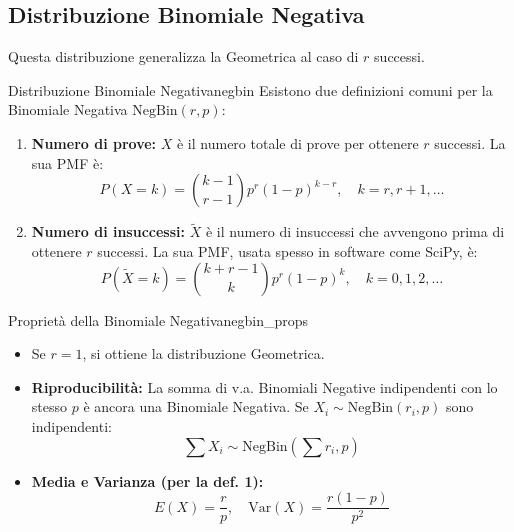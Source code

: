 \subsection{Distribuzione Binomiale Negativa}
Questa distribuzione generalizza la Geometrica al caso di \(r\) successi.

\begin{definizione}{Distribuzione Binomiale Negativa}{negbin}
Esistono due definizioni comuni per la Binomiale Negativa \(\text{NegBin}(r,p)\):
\begin{enumerate}
    \item \textbf{Numero di prove:} \(X\) è il numero totale di prove per ottenere \(r\) successi. La sua PMF è:
    \[ P(X=k) = \binom{k-1}{r-1}p^r(1-p)^{k-r}, \quad k=r, r+1, \dots \]
    \item \textbf{Numero di insuccessi:} \(\tilde{X}\) è il numero di insuccessi che avvengono prima di ottenere \(r\) successi. La sua PMF, usata spesso in software come SciPy, è:
    \[ P(\tilde{X}=k) = \binom{k+r-1}{k}p^r(1-p)^{k}, \quad k=0, 1, 2, \dots \]
\end{enumerate}
\end{definizione}

\begin{proposizione}{Proprietà della Binomiale Negativa}{negbin_props}
\begin{itemize}
    \item Se \(r=1\), si ottiene la distribuzione Geometrica.
    \item \textbf{Riproducibilità:} La somma di v.a. Binomiali Negative indipendenti con lo stesso \(p\) è ancora una Binomiale Negativa. Se \(X_i \sim \text{NegBin}(r_i, p)\) sono indipendenti:
    \[ \sum X_i \sim \text{NegBin}\left(\sum r_i, p\right) \]
    \item \textbf{Media e Varianza (per la def. 1):}
    \[ E(X) = \frac{r}{p}, \quad \text{Var}(X) = \frac{r(1-p)}{p^2} \]
\end{itemize}
\end{proposizione}
